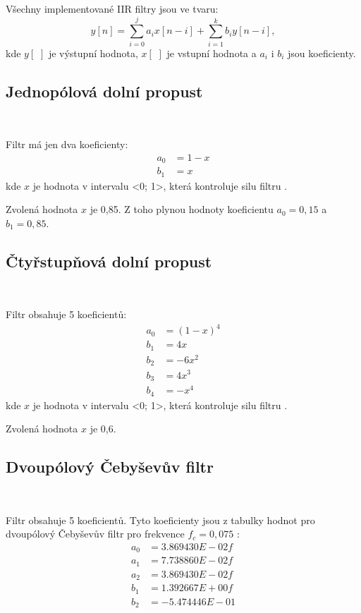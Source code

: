 Všechny implementované IIR filtry jsou ve tvaru:
\begin{equation}
y[n] = \sum_{i = 0}^{j}a_{i}x[n - i] + \sum_{i = 1}^{k}b_{i}y[n - i],
\end{equation}
kde $y[\,\,]$ je výstupní hodnota, $x[\,\,]$ je vstupní hodnota a $a_i$ i $b_i$ jsou
koeficienty.

\subsection{Jednopólová dolní propust}\

Filtr má jen dva koeficienty:
\begin{align}
a_0 &= 1 - x \\
b_1 &= x
\end{align}
kde $x$ je hodnota v intervalu <0; 1>, která kontroluje silu filtru \cite{Filters}.

Zvolená hodnota $x$ je 0,85. Z toho plynou hodnoty koeficientu $a_0 = 0,15$ a $b_1 =
0,85$.

\subsection{Čtyřstupňová dolní propust}\

Filtr obsahuje 5 koeficientů:
\begin{align}
a_0 &= (1 - x)^4 \\
b_1 &= 4x \\
b_2 &= -6x^2 \\
b_3 &= 4x^3 \\
b_4 &= -x^4
\end{align}
kde $x$ je hodnota v intervalu <0; 1>, která kontroluje silu filtru \cite{Filters}.

Zvolená hodnota $x$ je 0,6.

\subsection{Dvoupólový Čebyševův filtr}\

Filtr obsahuje 5 koeficientů. Tyto koeficienty jsou z tabulky hodnot pro dvoupólový
Čebyševův filtr pro frekvence $f_c = 0,075$ \cite{Filters}:
\begin{align}
a_0 &= 3.869430E-02f \\
a_1 &= 7.738860E-02f \\
a_2 &= 3.869430E-02f \\
b_1 &= 1.392667E+00f \\
b_2 &= -5.474446E-01 \\
\end{align}

